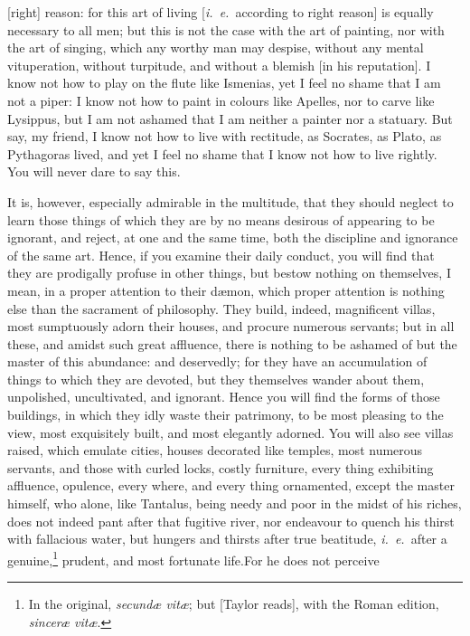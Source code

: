 \documentclass{article}
\begin{document}
[right] reason: for this art of living [\textit{i.~e.}~according to right
reason] is equally necessary to all men; but this is
not the case with the art of painting, nor with the art of
singing, which any worthy man may despise, without any
mental vituperation, without turpitude, and without a
blemish [in his reputation]. I know not how to play
on the flute like Ismenias, yet I feel no shame that I am
not a piper: I know not how to paint in colours like
Apelles, nor to carve like Lysippus, but I am not ashamed
that I am neither a painter nor a statuary. But say, my
friend, I know not how to live with rectitude, as Socrates,
as Plato, as Pythagoras lived, and yet I feel no shame
that I know not how to live rightly. You will never dare
to say this.

It is, however, especially admirable in the multitude,
that they should neglect to learn those things of which
they are by no means desirous of appearing to be ignorant,
and reject, at one and the same time, both the
discipline and ignorance of the same art. Hence, if you
examine their daily conduct, you will find that they are
prodigally profuse in other things, but bestow nothing on
themselves, I mean, in a proper attention to their d{\ae}mon,
which proper attention is nothing else than the sacrament
of philosophy. They build, indeed, magnificent villas,
most sumptuously adorn their houses, and procure numerous
servants; but in all these, and amidst such great
affluence, there is nothing to be ashamed of but the
master of this abundance: and deservedly; for they have
an accumulation of things to which they are devoted,
but they themselves wander about them, unpolished, uncultivated,
and ignorant. Hence you will find the forms
of those buildings, in which they idly waste their patrimony,
to be most pleasing to the view, most exquisitely
built, and most elegantly adorned. You will also see
villas raised, which emulate cities, houses decorated like
temples, most numerous servants, and those with curled
locks, costly furniture, every thing exhibiting affluence,
opulence, every where, and every thing ornamented,
except the master himself, who alone, like Tantalus,
being needy and poor in the midst of his riches, does
not indeed pant after that fugitive river, nor endeavour
to quench his thirst with fallacious water, but hungers
and thirsts after true beatitude, \textit{i.~e.}~after a genuine,\footnote{In
the original, \textit{secund{\ae} vit{\ae}}; but [Taylor reads], with the Roman
edition, \textit{sincer{\ae} vit{\ae}}.}
prudent, and most fortunate life.For he does not perceive
\end{document}
